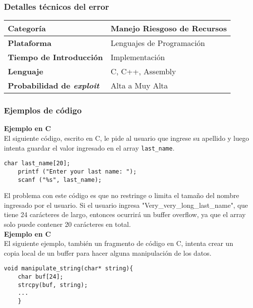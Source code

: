 \subsubsection{Detalles técnicos del error}
\begin{tabular}[\baselineskip]{|l|p{7cm}|}
  \hline
  \textbf{Categoría} & Manejo Riesgoso de Recursos \\
  \hline
  \textbf{Plataforma} & Lenguajes de Programación \\
  \hline
  \textbf{Tiempo de Introducción} & Implementación \\
  \hline
  \textbf{Lenguaje} & C, C++, Assembly \\
  \hline
  \textbf{Probabilidad de \emph{exploit}} & Alta a Muy Alta \\
  \hline
\end{tabular}

\subsubsection{Ejemplos de código}

\noindent \textbf{Ejemplo en C}\\

El siguiente código, escrito en C, le pide al usuario que ingrese su apellido y luego intenta guardar el valor ingresado en el array \texttt{last\_name}.

\begin{lstlisting}[frame=single]
    char last_name[20];
    printf ("Enter your last name: ");
    scanf ("%s", last_name);
\end{lstlisting}

El problema con este código es que no restringe o limita el tamaño del nombre ingresado por el usuario. Si el usuario ingresa "Very\_very\_long\_last\_name", que tiene 24 carácteres de largo,
entonces ocurrirá un buffer overflow, ya que el array solo puede contener 20 carácteres en total. \\

\noindent \textbf{Ejemplo en C}\\

El siguiente ejemplo, también un fragmento de código en C, intenta crear un copia local de un buffer para hacer alguna manipulación de los datos.

\begin{lstlisting}[frame=single]
    void manipulate_string(char* string){
    char buf[24];
    strcpy(buf, string);
    ...
    }
\end{lstlisting}

